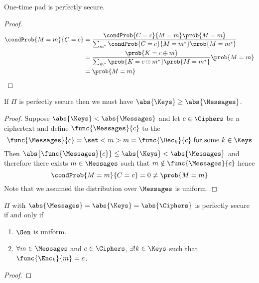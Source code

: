 \begin{theorem}
    One-time pad is perfectly secure.
\end{theorem}

\begin{proof}
    \begin{align*}
        \condProb{M = m }{C = c} &= \dfrac{\condProb{C = c}{M = m} \prob{M = m}}{\sum_{m^{\ast}} \condProb{C = c}{M = m^{\ast}} \prob{M = m^{\ast}}}\\
        &= \dfrac{\prob{K = c \oplus m}}{\sum_{m^{\ast}} \prob{K = c \oplus m^{\ast}} \prob{M = m^{\ast}}} \prob{M = m}\\
        &= \prob{M = m}
    \end{align*}
\end{proof}

\begin{proposition}
    If \(\Pi\) is perfectly secure then we must have \(\abs{\Keys} \geq \abs{\Messages}\).
\end{proposition}

\begin{proof}
    Suppose \(\abs{\Keys} < \abs{\Messages}\) and let \(c \in \Ciphers\) be a ciphertext and define \(\func{\Messages}{c}\) to the 
    \begin{equation*}
        \func{\Messages}{c} = \set<m>{m = \func{\Dec_k}{c} \ \text{for some}\ k \in \Keys }
    \end{equation*}
    Then \(\abs{\func{\Messages}{c}} \leq \abs{\Keys} < \abs{\Messages}\) and therefore there exists \(m \in \Messages\) such that \(m \notin \func{\Messages}{c}\) hence 
    \begin{equation*}
        \condProb{M = m}{C = c} = 0 \neq \prob{M = m}
    \end{equation*}
    Note that we assumed the distribution over \(\Messages\) is uniform.
\end{proof}

\begin{theorem}
    \(\Pi\) with \(\abs{\Messages} = \abs{\Keys} = \abs{\Ciphers}\) is perfectly secure if and only if 
    \begin{enumerate}
        \item \(\Gen\) is uniform.
        \item \(\forall m \in \Messages\) and \(c \in \Ciphers\), \(\exists! k \in \Keys\) such that \(\func{\Enc_k}{m} = c\).
    \end{enumerate}
\end{theorem}

\begin{proof}
    
\end{proof}